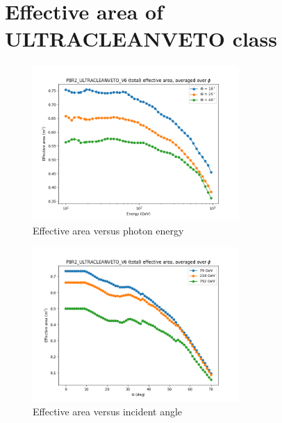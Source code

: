 \chapter{Effective area of ULTRACLEANVETO class}
\label{appendix:cleanveto_eff_area}


\begin{figure}[h]
    \centering
    \includegraphics[width=0.7\textwidth]{appendix/effective_area/figures/custom_eff_energy.png}
    \caption{Effective area versus photon energy}
    \label{fig:cleanveto_eff_e}
\end{figure}


\begin{figure}[h]
    \centering
    \includegraphics[width=0.7\textwidth]{appendix/effective_area/figures/custom_eff_theta.png}
    \caption{Effective area versus incident angle}
    \label{fig:cleanveto_eff_theta}
\end{figure}
